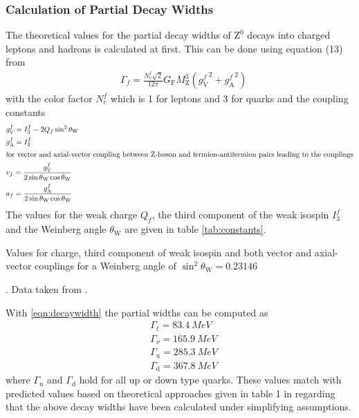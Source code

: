 \documentclass[11pt, a4paper]{article}
\numberwithin{equation}{section}
\begin{document}
\subsubsection{Calculation of Partial Decay Widths}
\label{sec:calc_partial_width}
The theoretical values for the partial decay widths of $\mathrm{Z}^0$ decays into charged leptons and hadrons is calculated at first.
This can be done using equation (13) from \cite{instructions}
\begin{align}
	&\Gamma_f = \frac{N_\mathrm{c}^f \sqrt{2}}{12 \pi} G_\mathrm{F} M_\mathrm{Z}^3 \left( {g_\mathrm{V}^f}^2 + {g_\mathrm{A}^f}^2 \right)
	\label{eqn:decaywidth}
\end{align}
with the color factor $N_c^f$ which is 1 for leptons and 3 for quarks and the coupling constants
\begin{align*}
	&g_\mathrm{V}^f = I_3^f - 2 Q_f \sin^2\theta_\mathrm{W}\\
	&g_\mathrm{A}^f = I_3^f \\
	\intertext{for vector and axial-vector coupling between Z-boson and fermion-antifermion pairs leading to the couplings}
	&v_f = \frac{g_\mathrm{V}^f}{2\sin\theta_\mathrm{W}\cos\theta_\mathrm{W}}\\
	&a_f = \frac{g_\mathrm{A}^f}{2\sin\theta_\mathrm{W}\cos\theta_\mathrm{W}}
\end{align*}
The values for the weak charge $Q_f$, the third component of the weak isospin $I_3^f$ and the Weinberg angle $\theta_\mathrm{W}$ are given in table \ref{tab:constants}.
\begin{table}[h]
	\centering
	
	\caption{Values for charge, third component of weak isospin and both vector and axial-vector couplings for a Weinberg angle of $\sin^2\theta_\mathrm{W}=\num{0.23146}$}. Data taken from \cite{thomson}.
	\label{tab:constants}
\end{table}
With \eqref{eqn:decaywidth} the partial widths can be computed as
\begin{align*}
	&\Gamma_\ell = \SI{83.4}{MeV} \\
	&\Gamma_\nu = \SI{165.9}{MeV} \\
	&\Gamma_\mathrm{u} = \SI{285.3}{MeV} \\
	&\Gamma_\mathrm{d} = \SI{367.8}{MeV}
\end{align*}
where $\Gamma_\mathrm{u}$ and $\Gamma_\mathrm{d}$ hold for all up or down type quarks.
These values match with predicted values based on theoretical approaches given in table 1 in \cite{instructions} regarding that the above decay widths have been calculated under simplifying assumptions. 
\end{document}
